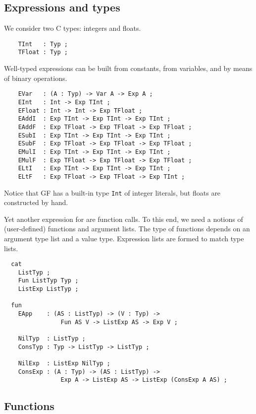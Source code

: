 \documentclass[12pt]{article}
\begin{document}
\subsection{Expressions and types}

We consider two C types: integers and floats.
\begin{verbatim}
    TInt   : Typ ;
    TFloat : Typ ;
\end{verbatim}
Well-typed expressions can be built from constants,
from variables, and by means of binary operations.
\begin{verbatim}
    EVar   : (A : Typ) -> Var A -> Exp A ;
    EInt   : Int -> Exp TInt ;
    EFloat : Int -> Int -> Exp TFloat ;
    EAddI  : Exp TInt -> Exp TInt -> Exp TInt ;
    EAddF  : Exp TFloat -> Exp TFloat -> Exp TFloat ;
    ESubI  : Exp TInt -> Exp TInt -> Exp TInt ;
    ESubF  : Exp TFloat -> Exp TFloat -> Exp TFloat ;
    EMulI  : Exp TInt -> Exp TInt -> Exp TInt ;
    EMulF  : Exp TFloat -> Exp TFloat -> Exp TFloat ;
    ELtI   : Exp TInt -> Exp TInt -> Exp TInt ;
    ELtF   : Exp TFloat -> Exp TFloat -> Exp TInt ;
\end{verbatim}
Notice that GF has a built-in type \texttt{Int} of
integer literals, but floats are constructed by hand.

Yet another expression for are function calls. To this
end, we need a notions of (user-defined) functions and
argument lists. The type of functions depends on an
argument type list and a value type. Expression lists
are formed to match type lists.
\begin{verbatim}
  cat
    ListTyp ;
    Fun ListTyp Typ ;
    ListExp ListTyp ;

  fun
    EApp    : (AS : ListTyp) -> (V : Typ) -> 
                Fun AS V -> ListExp AS -> Exp V ;

    NilTyp  : ListTyp ;
    ConsTyp : Typ -> ListTyp -> ListTyp ;

    NilExp  : ListExp NilTyp ;
    ConsExp : (A : Typ) -> (AS : ListTyp) -> 
                Exp A -> ListExp AS -> ListExp (ConsExp A AS) ;
\end{verbatim}



\subsection{Functions}
\end{document}
